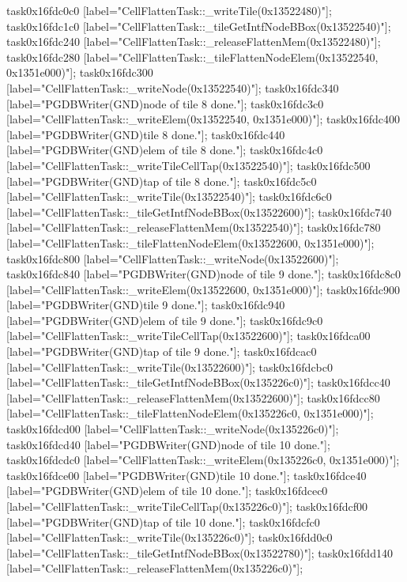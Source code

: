 {	task0x16fdc0c0 [label="CellFlattenTask::_writeTile(0x13522480)"];
	task0x16fdc1c0 [label="CellFlattenTask::_tileGetIntfNodeBBox(0x13522540)"];
	task0x16fdc240 [label="CellFlattenTask::_releaseFlattenMem(0x13522480)"];
	task0x16fdc280 [label="CellFlattenTask::_tileFlattenNodeElem(0x13522540, 0x1351e000)"];
	task0x16fdc300 [label="CellFlattenTask::_writeNode(0x13522540)"];
	task0x16fdc340 [label="PGDBWriter(GND)\nCell node of tile 8 done."];
	task0x16fdc3c0 [label="CellFlattenTask::_writeElem(0x13522540, 0x1351e000)"];
	task0x16fdc400 [label="PGDBWriter(GND)\nCell tile 8 done."];
	task0x16fdc440 [label="PGDBWriter(GND)\nCell elem of tile 8 done."];
	task0x16fdc4c0 [label="CellFlattenTask::_writeTileCellTap(0x13522540)"];
	task0x16fdc500 [label="PGDBWriter(GND)\nCell tap of tile 8 done."];
	task0x16fdc5c0 [label="CellFlattenTask::_writeTile(0x13522540)"];
	task0x16fdc6c0 [label="CellFlattenTask::_tileGetIntfNodeBBox(0x13522600)"];
	task0x16fdc740 [label="CellFlattenTask::_releaseFlattenMem(0x13522540)"];
	task0x16fdc780 [label="CellFlattenTask::_tileFlattenNodeElem(0x13522600, 0x1351e000)"];
	task0x16fdc800 [label="CellFlattenTask::_writeNode(0x13522600)"];
	task0x16fdc840 [label="PGDBWriter(GND)\nCell node of tile 9 done."];
	task0x16fdc8c0 [label="CellFlattenTask::_writeElem(0x13522600, 0x1351e000)"];
	task0x16fdc900 [label="PGDBWriter(GND)\nCell tile 9 done."];
	task0x16fdc940 [label="PGDBWriter(GND)\nCell elem of tile 9 done."];
	task0x16fdc9c0 [label="CellFlattenTask::_writeTileCellTap(0x13522600)"];
	task0x16fdca00 [label="PGDBWriter(GND)\nCell tap of tile 9 done."];
	task0x16fdcac0 [label="CellFlattenTask::_writeTile(0x13522600)"];
	task0x16fdcbc0 [label="CellFlattenTask::_tileGetIntfNodeBBox(0x135226c0)"];
	task0x16fdcc40 [label="CellFlattenTask::_releaseFlattenMem(0x13522600)"];
	task0x16fdcc80 [label="CellFlattenTask::_tileFlattenNodeElem(0x135226c0, 0x1351e000)"];
	task0x16fdcd00 [label="CellFlattenTask::_writeNode(0x135226c0)"];
	task0x16fdcd40 [label="PGDBWriter(GND)\nCell node of tile 10 done."];
	task0x16fdcdc0 [label="CellFlattenTask::_writeElem(0x135226c0, 0x1351e000)"];
	task0x16fdce00 [label="PGDBWriter(GND)\nCell tile 10 done."];
	task0x16fdce40 [label="PGDBWriter(GND)\nCell elem of tile 10 done."];
	task0x16fdcec0 [label="CellFlattenTask::_writeTileCellTap(0x135226c0)"];
	task0x16fdcf00 [label="PGDBWriter(GND)\nCell tap of tile 10 done."];
	task0x16fdcfc0 [label="CellFlattenTask::_writeTile(0x135226c0)"];
	task0x16fdd0c0 [label="CellFlattenTask::_tileGetIntfNodeBBox(0x13522780)"];
	task0x16fdd140 [label="CellFlattenTask::_releaseFlattenMem(0x135226c0)"];
}
